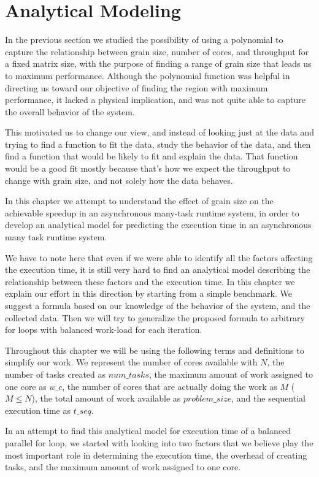 \section{Analytical Modeling}
In the previous section we studied the possibility of using a polynomial to capture the relationship between grain size, number of cores, and throughput for a fixed matrix size, with the purpose of finding a range of grain size that leads us to maximum performance. 
Although the polynomial function was helpful in directing us toward our objective of finding the region with maximum performance, it lacked a physical implication, and was not quite able to capture the overall behavior of the system. 

This motivated us to change our view, and instead of looking just at the data and trying to find a function to fit the data, study the behavior of the data, and then find a function that would be likely to fit and explain the data. That function would be a good fit mostly because that's how we expect the throughput to change with grain size, and not solely how the data behaves.   

In this chapter we attempt to understand the effect of grain size on the achievable speedup in an asynchronous many-task runtime system, in order to develop an analytical model for predicting the execution time in an asynchronous many task runtime system. 

We have to note here that even if we were able to identify all the factors affecting the execution time, it is still very hard to find an analytical model describing the relationship between these factors and the execution time. In this chapter we explain our effort in this direction by starting from a simple benchmark. We suggest a formula based on our knowledge of the behavior of the system, and the collected data. Then we will try to generalize the proposed formula to arbitrary for loops with balanced work-load for each iteration. 


Throughout this chapter we will be using the following terms and definitions to simplify our work. We represent the number of cores available with $N$, the number of tasks created as $num\_{tasks}$, the maximum amount of work assigned to one core as $w\_c$, the number of cores that are actually doing the work as $M$ ($M\leq{N}$), the total amount of work available as $problem\_{size}$, and the sequential execution time as $t\_{seq}$.

In an attempt to find this analytical model for execution time of a balanced parallel for loop, we started with looking into two factors that we believe play the most important role in determining the execution time, the overhead of creating tasks, and the maximum amount of work assigned to one core. 

